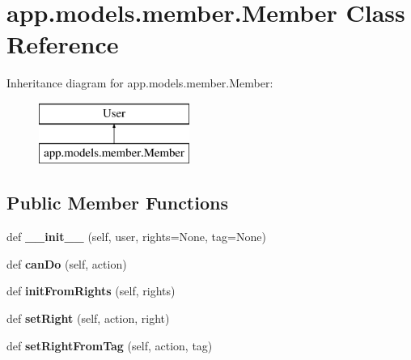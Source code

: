 \hypertarget{classapp_1_1models_1_1member_1_1_member}{}\section{app.\+models.\+member.\+Member Class Reference}
\label{classapp_1_1models_1_1member_1_1_member}
Inheritance diagram for app.\+models.\+member.\+Member\+:\begin{figure}[H]
\begin{center}
\leavevmode
\includegraphics[height=2.000000cm]{classapp_1_1models_1_1member_1_1_member}
\end{center}
\end{figure}
\subsection*{Public Member Functions}
\begin{DoxyCompactItemize}
\item 
\mbox{\label{classapp_1_1models_1_1member_1_1_member_a6454f50ef2a73289c9f550a94d969c68}} 
def {\bfseries \+\_\+\+\_\+init\+\_\+\+\_\+} (self, user, rights=None, tag=None)
\item 
\mbox{\label{classapp_1_1models_1_1member_1_1_member_a2b0c4af75389146a0cf2265d03e2be76}} 
def {\bfseries can\+Do} (self, action)
\item 
\mbox{\label{classapp_1_1models_1_1member_1_1_member_ada19bdf0e7750cbc581bd281c41f508c}} 
def {\bfseries init\+From\+Rights} (self, rights)
\item 
\mbox{\label{classapp_1_1models_1_1member_1_1_member_ab9f742bf8b7f9ed3aeeee52c34e03ffd}} 
def {\bfseries set\+Right} (self, action, right)
\item 
\mbox{\label{classapp_1_1models_1_1member_1_1_member_ad873bed67bb4f6064973044d3665db52}} 
def {\bfseries set\+Right\+From\+Tag} (self, action, tag)
\end{DoxyCompactItemize}
